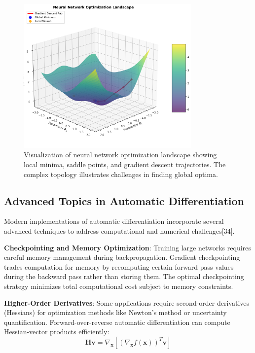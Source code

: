 \documentclass[11pt,a4paper]{report}
\begin{document}
\begin{figure}[H]
\centering
\includegraphics[width=0.8\textwidth]{optimization_landscape.png}
\caption{Visualization of neural network optimization landscape showing local minima, saddle points, and gradient descent trajectories. The complex topology illustrates challenges in finding global optima.}
\label{fig:optimization_landscape}
\end{figure}

\subsection{Advanced Topics in Automatic Differentiation}

Modern implementations of automatic differentiation incorporate several advanced techniques to address computational and numerical challenges[34].

\textbf{Checkpointing and Memory Optimization}: Training large networks requires careful memory management during backpropagation. Gradient checkpointing trades computation for memory by recomputing certain forward pass values during the backward pass rather than storing them. The optimal checkpointing strategy minimizes total computational cost subject to memory constraints.

\textbf{Higher-Order Derivatives}: Some applications require second-order derivatives (Hessians) for optimization methods like Newton's method or uncertainty quantification. Forward-over-reverse automatic differentiation can compute Hessian-vector products efficiently:
\begin{equation}
\mathbf{H}\mathbf{v} = \nabla_{\mathbf{x}} [(\nabla_{\mathbf{x}} f(\mathbf{x}))^T \mathbf{v}]
\end{equation}
\end{document}
